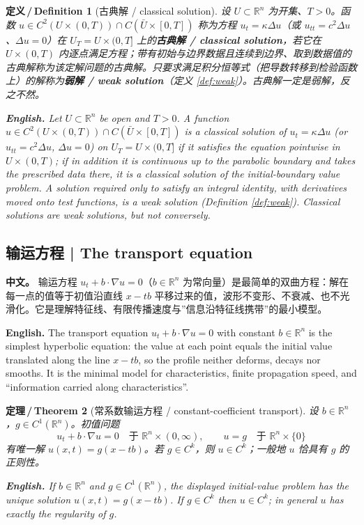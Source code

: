 \documentclass[UTF8,11pt,a4paper]{ctexart}
\newcommand{\APS}[2]{\par\noindent\textbf{中文。} #1\par\noindent\textbf{English.} #2\par\smallskip}
\newcommand{\EN}[1]{\par\noindent \textbf{English.} #1\par}
\newtheorem{definition}{定义\,/\,Definition}[section]
\newtheorem{theorem}[definition]{定理\,/\,Theorem}
\newcommand{\R}{\mathbb{R}}
\begin{document}
\begin{definition}[古典解 / classical solution]\label{def:classical}
设 $U\subset\R^n$ 为开集、$T>0$。函数 $u\in C^2(U\times(0,T))\cap C(\bar U\times[0,T])$ 称为方程 $u_t=\kappa\Delta u$（或 $u_{tt}=c^2\Delta u$、$\Delta u=0$）在 $U_T=U\times(0,T]$ 上的\textbf{古典解 / classical solution}，若它在 $U\times(0,T)$ 内逐点满足方程；带有初始与边界数据且连续到边界、取到数据值的古典解称为该定解问题的古典解。只要求满足积分恒等式（把导数转移到检验函数上）的解称为\textbf{弱解 / weak solution}（定义 \ref{def:weak}）。古典解一定是弱解，反之不然。
\EN{Let $U\subset\R^n$ be open and $T>0$. A function $u\in C^2(U\times(0,T))\cap C(\bar U\times[0,T])$ is a classical solution of $u_t=\kappa\Delta u$ (or $u_{tt}=c^2\Delta u$, $\Delta u=0$) on $U_T=U\times(0,T]$ if it satisfies the equation pointwise in $U\times(0,T)$; if in addition it is continuous up to the parabolic boundary and takes the prescribed data there, it is a classical solution of the initial-boundary value problem. A solution required only to satisfy an integral identity, with derivatives moved onto test functions, is a weak solution (Definition \ref{def:weak}). Classical solutions are weak solutions, but not conversely.}
\end{definition}

\subsection{输运方程 | The transport equation}
\APS{输运方程 $u_t+b\cdot\nabla u=0$（$b\in\R^n$ 为常向量）是最简单的双曲方程：解在每一点的值等于初值沿直线 $x-tb$ 平移过来的值，波形不变形、不衰减、也不光滑化。它是理解特征线、有限传播速度与''信息沿特征线携带''的最小模型。}{The transport equation $u_t+b\cdot\nabla u=0$ with constant $b\in\R^n$ is the simplest hyperbolic equation: the value at each point equals the initial value translated along the line $x-tb$, so the profile neither deforms, decays nor smooths. It is the minimal model for characteristics, finite propagation speed, and ``information carried along characteristics''.}

\begin{theorem}[常系数输运方程 / constant-coefficient transport]\label{thm:transport}
设 $b\in\R^n$，$g\in C^1(\R^n)$。初值问题
\[
u_t+b\cdot\nabla u=0\quad\text{于 }\R^n\times(0,\infty),\qquad u=g\quad\text{于 }\R^n\times\{0\}
\]
有唯一解 $u(x,t)=g(x-tb)$。若 $g\in C^k$，则 $u\in C^k$；一般地 $u$ 恰具有 $g$ 的正则性。
\EN{If $b\in\R^n$ and $g\in C^1(\R^n)$, the displayed initial-value problem has the unique solution $u(x,t)=g(x-tb)$. If $g\in C^k$ then $u\in C^k$; in general $u$ has exactly the regularity of $g$.}
\end{theorem}
\end{document}
